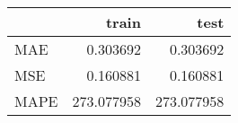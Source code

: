 \begin{tabular}{lrr}
\toprule
{} &       train &        test \\
\midrule
MAE  &    0.303692 &    0.303692 \\
MSE  &    0.160881 &    0.160881 \\
MAPE &  273.077958 &  273.077958 \\
\bottomrule
\end{tabular}

